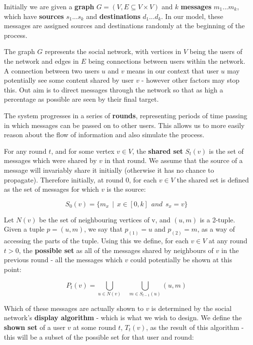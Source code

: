 \documentclass[bsc,frontabs,twoside,singlespacing,parskip,deptreport]{infthesis}     %
\begin{document}
Initially we are given a \textbf{graph} $G = (V, E \subseteq V \times V)$ and $k$ \textbf{messages} $ m_{1} ... m_{k}$, which have \textbf{sources} $s_{1} ... s_{k}$ and \textbf{destinations} $d_{1} ... d_{k}$. In our model, these messages are assigned sources and destinations randomly at the beginning of the process.

The graph $G$ represents the social network, with vertices in $V$ being the users of the network and edges in $E$ being connections between users within the network. A connection between two users $u$ and $v$ means in our context that user $u$ may potentially see some content shared by user $v$ - however other factors may stop this. Out aim is to direct messages through the network so that as high a percentage as possible are seen by their final target.

The system progresses in a series of \textbf{rounds}, representing periods of time passing in which messages can be passed on to other users. This allows us to more easily reason about the flow of information and also simulate the process.

For any round $t$, and for some vertex $v \in V$, the \textbf{shared set} $S_{t}(v)$ is the set of messages which were shared by $v$ in that round. We assume that the source of a message will invariably share it initially (otherwise it has no chance to propagate). Therefore initially, at round 0, for each $v \in V$ the shared set is defined as the set of messages for which $v$ is the source:

\begin{equation}
S_{0}(v) = \{m_{x} \:\: | \:\: x \in [0, k] \:\: and \:\: s_{x} = v\}
\end{equation}


Let $N(v)$ be the set of neighbouring vertices of v, and $(u, m)$ is a 2-tuple. Given a tuple $p = (u, m)$, we say that $p_{(1)} = u$ and $p_{(2)} = m$, as a way of accessing the parts of the tuple. Using this we define, for each $v \in V$ at any round $t > 0$, the \textbf{possible set} as all of the messages shared by neighbours of $v$ in the previous round - all the messages which $v$ could potentially be shown at this point:

\begin{equation}
P_{t}(v) = \bigcup_{u \in N(v)} \:\:\:\: \bigcup_{m \in S_{t-1}(u)} (u, m)
\end{equation}

Which of these messages are actually shown to $v$ is determined by the social network's \textbf{display algorithm} - which is what we wish to design. We define the \textbf{shown set} of a user $v$ at some round $t$, $T_{t}(v)$, as the result of this algorithm - this will be a subset of the possible set for that user and round:
\end{document}

